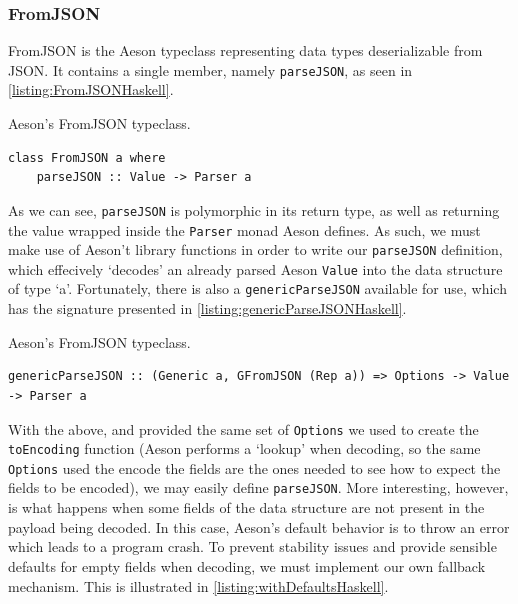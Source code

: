 \documentclass[11pt]{report}
\begin{document}
\subsubsection{FromJSON}

FromJSON is the Aeson typeclass representing data types deserializable from
JSON\@. It contains a single member, namely \texttt{parseJSON}, as seen in
\autoref{listing:FromJSONHaskell}.

\begin{listing}[H]
\caption{Aeson's FromJSON typeclass.}
\label{listing:FromJSONHaskell}
\begin{verbatim}
class FromJSON a where
    parseJSON :: Value -> Parser a
\end{verbatim}
\end{listing}

As we can see, \texttt{parseJSON} is polymorphic in its return type, as well as
returning the value wrapped inside the \texttt{Parser} monad Aeson defines. As
such, we must make use of Aeson't library functions in order to write our
\texttt{parseJSON} definition, which effecively `decodes' an already parsed
Aeson \texttt{Value} into the data structure of type `a'. Fortunately, there is
also a \texttt{genericParseJSON} available for use, which has the signature
presented in \autoref{listing:genericParseJSONHaskell}.

\begin{listing}[H]
\caption{Aeson's FromJSON typeclass.}
\label{listing:genericParseJSONHaskell}
\begin{verbatim}
genericParseJSON :: (Generic a, GFromJSON (Rep a)) => Options -> Value -> Parser a
\end{verbatim}
\end{listing}

With the above, and provided the same set of \texttt{Options} we used to create
the \texttt{toEncoding} function (Aeson performs a `lookup' when decoding, so
the same \texttt{Options} used the encode the fields are the ones needed to see
how to expect the fields to be encoded), we may easily define
\texttt{parseJSON}. \newline
More interesting, however, is what happens when some fields of the
data structure are not present in the payload being decoded. In this case,
Aeson's default behavior is to throw an error which leads to a program crash.
To prevent stability issues and provide sensible defaults for empty fields when
decoding, we must implement our own fallback mechanism. This is illustrated in
\autoref{listing:withDefaultsHaskell}.
\end{document}
